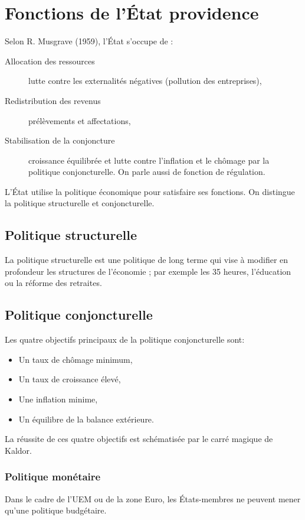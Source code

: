 \documentclass[10pt,a4paper,french]{article}
\begin{document}
\section{Fonctions de l'État providence}

Selon R. Musgrave (1959), l'État s'occupe de :
\begin{description}
\item[Allocation des ressources] lutte contre les externalités négatives (pollution des entreprises),
\item[Redistribution des revenus] prélèvements et affectations,
\item[Stabilisation de la conjoncture] croissance équilibrée et lutte contre l'inflation et le chômage par la politique conjoncturelle. On parle aussi de fonction de régulation.
\end{description}

L'État utilise la politique économique pour satisfaire ses fonctions. On distingue la politique structurelle et conjoncturelle.

\subsection{Politique structurelle}

La politique structurelle est une politique de long terme qui vise à modifier en profondeur les structures de l'économie ; par exemple les 35 heures, l'éducation ou la réforme des retraites.

\subsection{Politique conjoncturelle}

Les quatre objectifs principaux de la politique conjoncturelle sont:
\begin{itemize}
\item Un taux de chômage minimum,
\item Un taux de croissance élevé,
\item Une inflation minime,
\item Un équilibre de la balance extérieure.
\end{itemize}

La réussite de ces quatre objectifs est schématisée par le carré magique de Kaldor.

\subsubsection{Politique monétaire}
Dans le cadre de l’UEM ou de la zone Euro, les États-membres ne peuvent mener qu’une politique budgétaire.
\end{document}
